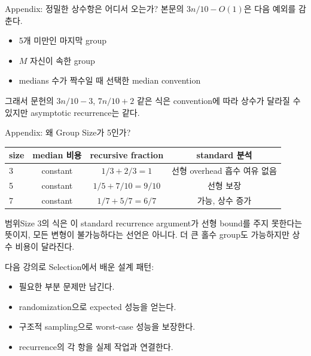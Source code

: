 \begin{frame}{Appendix: 정밀한 상수항은 어디서 오는가?}
\optional[Appendix]\hfill
본문의 $3n/10-O(1)$은 다음 예외를 감춘다.
\begin{itemize}\item 5개 미만인 마지막 group\item $M$ 자신이 속한 group\item medians 수가 짝수일 때 선택한 median convention\end{itemize}
그래서 문헌의 $3n/10-3$, $7n/10+2$ 같은 식은 convention에 따라 상수가 달라질 수 있지만 asymptotic recurrence는 같다.
\end{frame}
\begin{frame}{Appendix: 왜 Group Size가 5인가?}
\optional[Appendix]\hfill
\begin{tabular}{lccc}\toprule size&median 비용&recursive fraction&standard 분석\\\midrule
3&constant&$1/3+2/3=1$&선형 overhead 흡수 여유 없음\\
5&constant&$1/5+7/10=9/10$&선형 보장\\
7&constant&$1/7+5/7=6/7$&가능, 상수 증가\\\bottomrule
\end{tabular}
\begin{block}{범위}Size 3의 식은 이 standard recurrence argument가 선형 bound를 주지 못한다는 뜻이지, 모든 변형이 불가능하다는 선언은 아니다. 더 큰 홀수 group도 가능하지만 상수 비용이 달라진다.\end{block}
\end{frame}
\begin{frame}{다음 강의로}
Selection에서 배운 설계 패턴:
\begin{itemize}\item 필요한 부분 문제만 남긴다.\item randomization으로 expected 성능을 얻는다.\item 구조적 sampling으로 worst-case 성능을 보장한다.\item recurrence의 각 항을 실제 작업과 연결한다.\end{itemize}
\end{frame}
